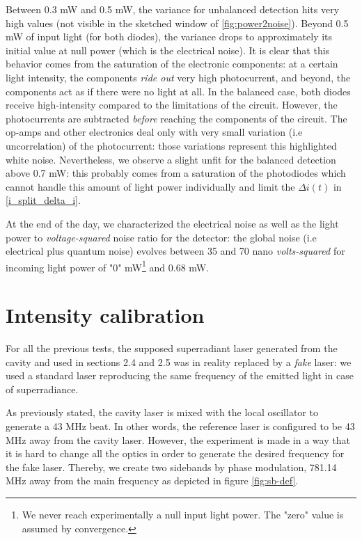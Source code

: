 \documentclass[11pt]{report}
\begin{document}
Between 0.3 mW and 0.5 mW, the variance for unbalanced detection hits very high values (not visible in the sketched window of \ref{fig:power2noise}). Beyond 0.5 mW of input light (for both diodes), the variance drops to approximately its initial value at null power (which is the electrical noise). It is clear that this behavior comes from the saturation of the electronic components: at a certain light intensity, the components \textit{ride out} very high photocurrent, and beyond, the components act as if there were no light at all. In the balanced case, both diodes receive high-intensity compared to the limitations of the circuit. However, the photocurrents are subtracted \textit{before} reaching the components of the circuit. The op-amps and other electronics deal only with very small variation (i.e uncorrelation) of the photocurrent: those variations represent this highlighted white noise. Nevertheless, we observe a slight unfit for the balanced detection above 0.7 mW: this probably comes from a saturation of the photodiodes which cannot handle this amount of light power individually and limit the $\Delta i(t)$ in \eqref{i_split_delta_i}.

At the end of the day, we characterized the electrical noise as well as the light power to \textit{voltage-squared} noise ratio for the detector: the global noise (i.e electrical plus quantum noise) evolves between 35 and 70 nano \textit{volts-squared} for incoming light power of "0" mW\footnote{We never reach experimentally a null input light power. The "zero" value is assumed by convergence.} and 0.68 mW.

\section{Intensity calibration}

For all the previous tests, the supposed superradiant laser generated from the cavity and used in sections 2.4 and 2.5 was in reality replaced by a \textit{fake} laser: we used a standard laser reproducing the same frequency of the emitted light in case of superradiance.

As previously stated, the cavity laser is mixed with the local oscillator to generate a 43 MHz beat. In other words, the reference laser is configured to be 43 MHz away from the cavity laser. However, the experiment is made in a way that it is hard to change all the optics in order to generate the desired frequency for the fake laser. Thereby, we create two sidebands by phase modulation, 781.14 MHz away from the main frequency as depicted in figure \ref{fig:sb-def}.
\end{document}
